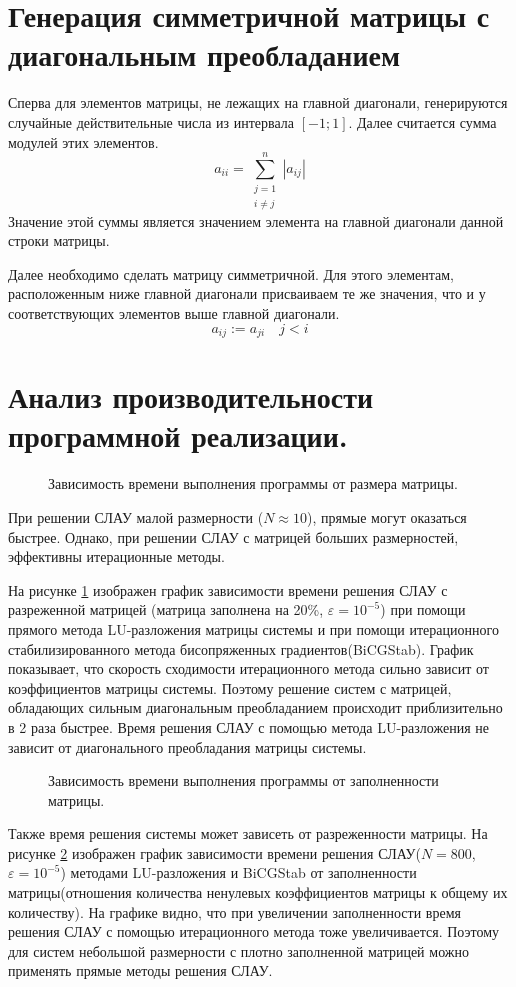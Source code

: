 \documentclass[a4paper, fontsize=14pt]{article}
\begin{document}
\section{Генерация симметричной матрицы с диагональным преобладанием}
Сперва для элементов матрицы, не лежащих на главной диагонали, генерируются случайные действительные
числа из интервала $[-1;1]$. Далее считается сумма модулей этих элементов. 
$$
    a_{ii} = \sum^{n}_{\substack{j=1\\ i \neq j}} |a_{ij}| 
$$
Значение этой суммы является значением элемента на главной диагонали данной строки матрицы. 

Далее необходимо сделать матрицу симметричной. Для этого элементам, расположенным ниже главной
диагонали присваиваем те же значения, что и у соответствующих элементов выше главной диагонали.
$$
    a_{ij} := a_{ji} \quad j<i
$$
\section{Анализ производительности программной реализации.}
\begin{figure}[h]
    \scriptsize
    \centering
    
    \caption{Зависимость времени выполнения программы от размера матрицы.}
    \label{fig:comp}
\end{figure}
При решении СЛАУ малой размерности ($N \approx 10$), прямые могут оказаться быстрее.
Однако, при решении СЛАУ с матрицей больших размерностей, эффективны итерационные методы. 

На рисунке \ref{fig:comp} изображен график зависимости времени решения СЛАУ с разреженной матрицей
(матрица заполнена на 20\%, $\varepsilon = 10^{-5}$) при помощи прямого метода LU-разложения
матрицы системы и при помощи итерационного стабилизированного метода бисопряженных
градиентов(BiCGStab). График показывает, что скорость
сходимости итерационного метода сильно зависит от коэффициентов матрицы системы. Поэтому решение
систем с матрицей, обладающих сильным диагональным преобладанием происходит приблизительно в 2 раза
быстрее. Время решения СЛАУ с помощью метода LU-разложения не зависит от диагонального преобладания
матрицы системы. 

\begin{figure}[H]
    \scriptsize
    \centering
    
    \caption{Зависимость времени выполнения программы от заполненности матрицы.}
    \label{fig:fill}
\end{figure}
Также время решения системы может зависеть от разреженности матрицы. На рисунке \ref{fig:fill}
изображен график зависимости времени решения СЛАУ($N=800$, $\varepsilon = 10^{-5}$) методами LU-разложения и BiCGStab от заполненности
матрицы(отношения количества ненулевых коэффициентов матрицы к общему их количеству). На графике
видно, что при увеличении заполненности время решения СЛАУ с помощью итерационного метода тоже
увеличивается. Поэтому для систем небольшой размерности с плотно заполненной матрицей можно
применять прямые методы решения СЛАУ.
\end{document}
